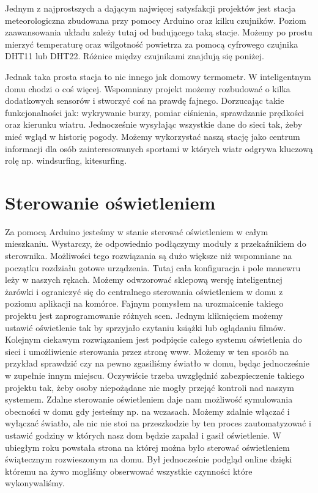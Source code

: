 \documentclass[brudnopis]{xmgr}
\begin{document}
Jednym z najprostszych a dającym najwięcej satysfakcji projektów jest stacja meteorologiczna zbudowana przy pomocy Arduino oraz kilku czujników. Poziom zaawansowania układu zależy tutaj od budującego taką stacje. Możemy po prostu mierzyć temperaturę oraz wilgotność powietrza za pomocą cyfrowego czujnika DHT11 lub DHT22. Różnice między czujnikami znajdują się poniżej. 

Jednak taka prosta stacja to nic innego jak domowy termometr. W inteligentnym domu chodzi o coś więcej. Wspomniany projekt możemy rozbudować o kilka dodatkowych sensorów i stworzyć coś na prawdę fajnego. 
Dorzucając takie funkcjonalności jak: wykrywanie burzy, pomiar ciśnienia, sprawdzanie prędkości oraz kierunku wiatru. Jednocześnie wysyłając wszystkie dane do sieci tak, żeby mieć wgląd w historię pogody. Możemy wykorzystać naszą stację jako centrum informacji dla osób zainteresowanych sportami w których wiatr odgrywa kluczową rolę np. windsurfing, kitesurfing. 

\section{Sterowanie oświetleniem}

Za pomocą Arduino jesteśmy w stanie sterować oświetleniem w całym mieszkaniu. Wystarczy, że odpowiednio podłączymy moduły z przekaźnikiem do sterownika. Możliwości tego rozwiązania są dużo większe niż wspomniane na początku rozdziału gotowe urządzenia. Tutaj cała konfiguracja i pole manewru leży w naszych rękach. Możemy odwzorować sklepową wersję inteligentnej żarówki i ograniczyć się do centralnego sterowania oświetleniem w domu z poziomu aplikacji na komórce.
Fajnym pomysłem na urozmaicenie takiego projektu jest zaprogramowanie różnych scen. Jednym kliknięciem możemy ustawić oświetlenie tak by sprzyjało czytaniu książki lub oglądaniu filmów.
Kolejnym ciekawym rozwiązaniem jest podpięcie całego systemu oświetlenia do sieci i umożliwienie sterowania przez stronę www. Możemy w ten sposób na przykład sprawdzić czy na pewno zgasiliśmy światło w domu, będąc jednocześnie w zupełnie innym miejscu. Oczywiście trzeba uwzględnić zabezpieczenie takiego projektu tak, żeby osoby niepożądane nie mogły przejąć kontroli nad naszym systemem. Zdalne sterowanie oświetleniem daje nam możliwość symulowania obecności w domu gdy jesteśmy np. na wczasach. Możemy zdalnie włączać i wyłączać światło, ale nic nie stoi na przeszkodzie by ten proces zautomatyzować i ustawić godziny w których nasz dom będzie zapalał i gasił oświetlenie.
W ubiegłym roku powstała strona na której można było sterować oświetleniem świątecznym rozwieszonym na domu. Był jednocześnie podgląd online dzięki któremu na żywo mogliśmy obserwować wszystkie czynności które wykonywaliśmy. 
\end{document}
